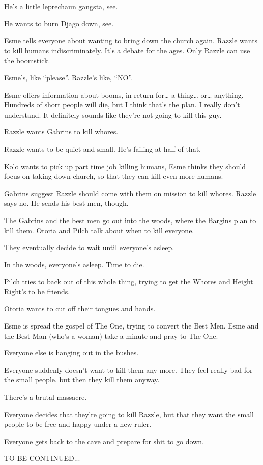 He’s a little leprechaun gangsta, see.\medskip

He wants to burn Djago down, see.\medskip

Esme tells everyone about wanting to bring down the church again. Razzle wants to kill humans indiscriminately. It’s a debate for the ages. Only Razzle can use the boomstick.\medskip

Esme’s, like “please”. Razzle’s like, “NO”.\medskip

Esme offers information about booms, in return for… a thing… or… anything. Hundreds of short people will die, but I think that’s the plan. I really don’t understand. It definitely sounds like they’re not going to kill this guy.\medskip

Razzle wants Gabrins to kill whores.\medskip

Razzle wants to be quiet and small. He’s failing at half of that.\medskip

Kolo wants to pick up part time job killing humans, Esme thinks they should focus on taking down church, so that they can kill even more humans.\medskip

Gabrins suggest Razzle should come with them on mission to kill whores. Razzle says no. He sends his best men, though.\medskip

The Gabrins and the best men go out into the woods, where the Bargins plan to kill them. Otoria and Pilch talk about when to kill everyone.\medskip

They eventually decide to wait until everyone’s asleep.\medskip

In the woods, everyone’s asleep. Time to die.\medskip

Pilch tries to back out of this whole thing, trying to get the Whores and Height Right’s to be friends.\medskip

Otoria wants to cut off their tongues and hands.\medskip

Esme is spread the gospel of The One, trying to convert the Best Men. Esme and the Best Man (who’s a woman) take a minute and pray to The One.\medskip

Everyone else is hanging out in the bushes.\medskip

Everyone suddenly doesn’t want to kill them any more. They feel really bad for the small people, but then they kill them anyway.\medskip

There’s a brutal massacre.\medskip

Everyone decides that they’re going to kill Razzle, but that they want the small people to be free and happy under a new ruler.\medskip

Everyone gets back to the cave and prepare for shit to go down.\medskip

TO BE CONTINUED...